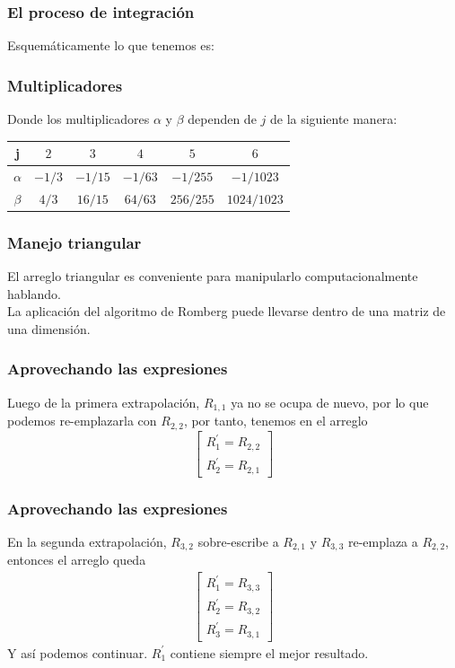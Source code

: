 \begin{frame}[fragile]
\frametitle{El proceso de integración}
Esquemáticamente lo que tenemos es:
\begin{figure}
  \centering
  
\end{figure}
\end{frame}
\begin{frame}
\frametitle{Multiplicadores}
Donde los multiplicadores $\alpha$ y $\beta$ dependen de $j$ de la siguiente manera:
\fontsize{12}{12}\selectfont
\begin{center}
\begin{tabular}{c | c | c | c | c | c}
\hline
j & $2$ & $3$ & $4$ & $5$ & $6$ \\ \hline
$\alpha$ & $-1/3$ & $-1/15$ & $-1/63$ & $-1/255$ & $-1/1023$ \\ \hline
$\beta$ & $4/3$ & $16/15$ & $64/63$ & $256/255$ & $1024/1023$ \\ \hline
\end{tabular}
\end{center}
\end{frame}
\begin{frame}
\frametitle{Manejo triangular}
El arreglo triangular es conveniente para manipularlo computacionalmente hablando.
\\
\bigskip
La aplicación del algoritmo de Romberg puede llevarse dentro de una matriz de una dimensión.
\end{frame}
\begin{frame}
\frametitle{Aprovechando las expresiones}
Luego de la primera extrapolación, $R_{1,1}$ ya no se ocupa de nuevo, por lo que podemos re-emplazarla con $R_{2,2}$, por tanto, tenemos en el arreglo
\[ \begin{bmatrix}
R^{\prime}_{1} = R_{2, 2} \\
R^{\prime}_{2} = R_{2, 1}
\end{bmatrix} \]
\end{frame}
\begin{frame}
\frametitle{Aprovechando las expresiones}
En la segunda extrapolación, $R_{3, 2} $ sobre-escribe a $R_{2, 1}$ y $R_{3, 3}$ re-emplaza a $R_{2, 2}$, entonces el arreglo queda
\begin{align*} \begin{bmatrix}
R^{\prime}_{1} = R_{3, 3} \\
R^{\prime}_{2} = R_{3, 2} \\
R^{\prime}_{3} = R_{3, 1}
\end{bmatrix}
\end{align*} 
\pause
Y así podemos continuar. $R^{\prime}_{1}$ contiene siempre el mejor resultado.
\end{frame}
